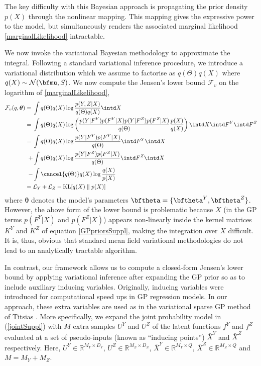 \noindent The key difficulty with this Bayesian approach is propagating the prior
density $p(X)$ through the nonlinear mapping. This
mapping gives the expressive power to the model, but simultaneously
renders the associated marginal likelihood \eqref{marginalLikelihood} intractable. 

\par We now invoke the variational Bayesian methodology to
approximate the integral. Following a standard variational inference procedure,
 we introduce a variational distribution which we assume to factorise as $q(\Theta)q(X)$ 
where $q(X) \sim \mathcal{N}(\bfmu, S)$. We now
compute the Jensen's lower bound $\mathcal{F}_v$ on the logarithm of
\eqref{marginalLikelihood},
%
\begin{align}
\mathcal{F}_v(q, \boldsymbol \theta) = {}&
  \int q(\Theta)q(X) \log 
	\frac{ p(Y,Z |X)}
		 {q(\Theta)q(X)}  \intd  X \nonumber \\
= {}& 
  \int q(\Theta)q(X) \log \left(
	\frac{p( Y | F^Y ) p(F^Y | X ) p( Y | F^Z ) p(F^Z | X )}{q(\Theta)}
        \frac{p(X)}{q(X)} \right)
  \intd  X \intd F^Y \intd F^Z \nonumber \\
 ={}&
      \int q(\Theta) q(X) \log \frac{p( Y | F^Y ) p(F^Y | X )}{q(\Theta)} \intd F^Y \intd X  \nonumber \\
 +{}& \int q(\Theta) q(X) \log \frac{p( Y | F^Z ) p(F^Z | X )}{q(\Theta)} \intd F^Z \intd X  \nonumber \\
 -{}& \int \cancel{q(\Theta)} q(X) \log \frac{q(X)}{p(X)} \nonumber \\
={}& \mathcal{L}_Y + \mathcal{L}_Z - \text{KL}[q(X) \parallel p(X)]
		 \label{jensens1Suppl}
\end{align}
%
where $\boldsymbol \theta$ denotes the model's parameters $\bftheta = \{\bftheta^Y, \bftheta^Z\}$.  However,
the above form of the lower bound is problematic because $X$ (in the
GP terms $p(F^Y|X)$ and $p(F^Z|X)$) appears non-linearly inside the kernel matrices
$K^Y$ and $K^Z$ of equation \eqref{GPpriorsSuppl}, making the integration over $X$ difficult.
It is, thus, obvious that standard mean field variational methodologies do not lead to an analytically
tractable algorithm.
\par In contrast, our framework allows us to compute
a closed-form Jensen's lower bound
by applying variational inference after expanding the GP prior so as to include auxiliary inducing
variables. Originally, inducing variables were introduced for computational speed ups in GP regression models.
 In our approach, these extra variables are used as in the variational sparse GP method of Titsias
\cite{Titsias:variational09}.
More specifically, we expand the joint
 probability model in (\ref{jointSuppl}) 
 with $M$ extra samples $U^Y$ and $U^Z$ of the latent functions $f^Y$ and $f^Z$ evaluated at a set of pseudo-inputs
(known as ``inducing points'')
$\bar{X}^Y$ and $\bar{X}^Z$ respectively. Here, 
$U^Y \in \mathbb{R}^{M_Y \times D_Y}$, $U^Z \in \mathbb{R}^{M_Z \times D_Z}$,
 $\bar{X}^Y \in \mathbb{R}^{M_Y \times Q}$,  $\bar{X}^Z \in \mathbb{R}^{M_Z \times Q}$
and $M = M_Y+M_Z$.


